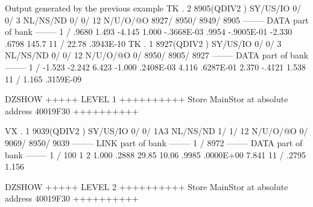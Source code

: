 \begin{landscapebody}
\begin{XMPt}{Output generated by the previous example}
 TK  .     2     8905(QDIV2   ) SY/US/IO    0/    0/   3 NL/NS/ND    0/    0/      12 N/U/O/@O    8927/    8950/    8949/    8905
--------  DATA part of bank  --------                                                                                            
      1 /   .9680       1.493      -4.145       1.000      -.3668E-03   .9954      -.9005E-01  -2.330       .6798       145.7    
     11 /   22.78       .3943E-10                                                                                                
 TK  .     1     8927(QDIV2   ) SY/US/IO    0/    0/   3 NL/NS/ND    0/    0/      12 N/U/O/@O       0/    8950/    8905/    8927
--------  DATA part of bank  --------                                                                                            
      1 /  -1.523      -2.242       6.423      -1.000       .2408E-03   4.116       .6287E-01   2.370      -.4121       1.538    
     11 /   1.165       .3159E-09                                                                                                
                                                                                                                                 
DZSHOW  +++++ LEVEL     1 ++++++++++            Store  MainStor at absolute address 40019F30      ++++++++++                     
                                                                                                                                 
 VX  .     1     9039(QDIV2   ) SY/US/IO    0/    0/ 1A3 NL/NS/ND    1/    1/      12 N/U/O/@O       0/    9069/    8950/    9039
--------  LINK part of bank  --------                                                                                            
      1 /        8972                                                                                                            
--------  DATA part of bank  --------                                                                                            
      1 /         100           1           2   1.000       .2888       29.85       10.06       .9985       .0000E+00   7.841    
     11 /   .2795       1.156                                                                                                    
                                                                                                                                 
DZSHOW  +++++ LEVEL     2 ++++++++++            Store  MainStor at absolute address 40019F30      ++++++++++                     
                                                                                                                                 

\end{XMPt}
\end{landscapebody}
